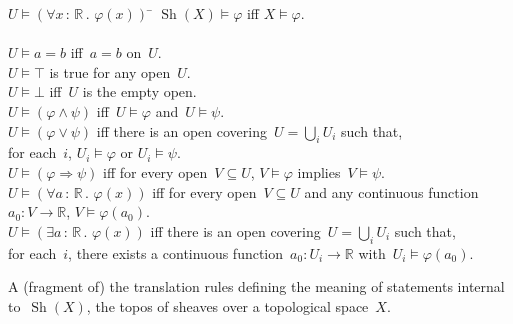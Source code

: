 \documentclass[oneside]{amsart}
\theoremstyle{definition}
\theoremstyle{plain}
\theoremstyle{remark}
\newcommand{\RR}{\mathbb{R}}
\DeclareMathOperator{\Sh}{Sh}
\renewcommand{\_}{\mathpunct{.}\,}
\newcommand{\?}{\,{:}\,}
\begin{document}
\begin{table}
  \begin{tabbing}
    $U \models (\forall x\?\RR\_ \varphi(x))$ \= \kill
    $\Sh(X) \models \varphi$ \> iff $X \models \varphi$. \\\\
    $U \models a = b$ \> iff~$a = b$ on~$U$. \\
    $U \models \top$ \> is true for any open~$U$. \\
    $U \models \bot$ \> iff~$U$ is the empty open. \\
    $U \models (\varphi \wedge \psi)$ \> iff~$U \models \varphi$ and~$U \models \psi$. \\
    $U \models (\varphi \vee \psi)$ \> iff there is an open covering~$U =
    \bigcup_i U_i$ such that, \\ \> \qquad for each~$i$, $U_i \models \varphi$
    or $U_i \models \psi$. \\
    $U \models (\varphi \Rightarrow \psi)$ \> iff for every open~$V \subseteq U$,
    $V \models \varphi$ implies~$V \models \psi$. \\
    $U \models (\forall a\?\RR\_ \varphi(x))$ \> iff for every open~$V
    \subseteq U$ and any continuous function~$a_0 : V \to \RR$, $V \models
    \varphi(a_0)$. \\
    $U \models (\exists a\?\RR\_ \varphi(x))$ \> iff there is an open
    covering~$U = \bigcup_i U_i$ such that, \\ \> \qquad for each~$i$,
    there exists a continuous function~$a_0 : U_i \to \RR$ with~$U_i \models
    \varphi(a_0)$.
  \end{tabbing}

  \caption{\label{table:sheaf} A (fragment of) the translation rules defining
  the meaning of statements internal to~$\Sh(X)$, the topos of sheaves over a
  topological space~$X$.}
\end{table}
\end{document}
